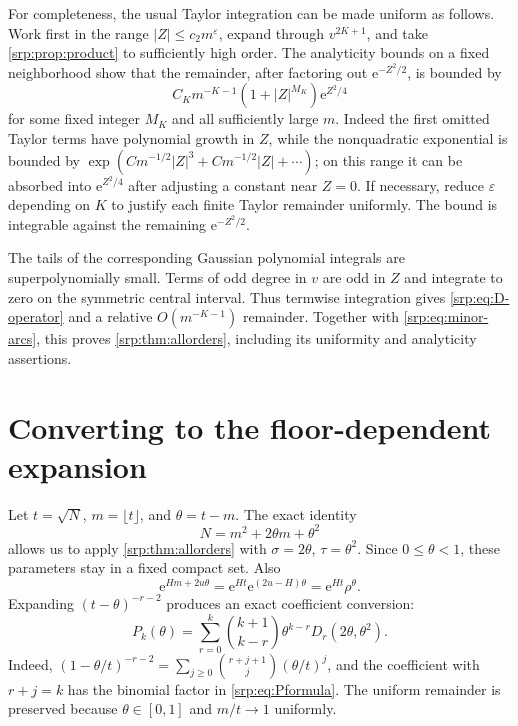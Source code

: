 \documentclass[11pt,a4paper]{article}
\numberwithin{equation}{section}
\theoremstyle{definition}
\theoremstyle{remark}
\newcommand{\e}{\mathrm e}
\begin{document}
For completeness, the usual Taylor integration can be made uniform as
follows. Work first in the range $|Z|\le c_2m^\varepsilon$, expand through
$v^{2K+1}$, and take \cref{srp:prop:product} to sufficiently high order.
The analyticity bounds on a fixed neighborhood show that the remainder,
after factoring out $\e^{-Z^2/2}$, is bounded by
\[
 C_K m^{-K-1}(1+|Z|^{M_K})\e^{Z^2/4}
\]
for some fixed integer $M_K$ and all sufficiently large $m$. Indeed the
first omitted Taylor terms have polynomial growth in $Z$, while the
nonquadratic exponential is bounded by
$\exp(Cm^{-1/2}|Z|^3+C m^{-1/2}|Z|+\cdots)$; on this range it can be
absorbed into $\e^{Z^2/4}$ after adjusting a constant near $Z=0$.
If necessary, reduce $\varepsilon$ depending on $K$ to justify each
finite Taylor remainder uniformly. The bound is integrable against the
remaining $\e^{-Z^2/2}$.

The tails of the corresponding Gaussian polynomial integrals are
superpolynomially small. Terms of odd degree in $v$ are odd in $Z$ and
integrate to zero on the symmetric central interval. Thus termwise
integration gives \eqref{srp:eq:D-operator} and a relative
$O(m^{-K-1})$ remainder. Together with \eqref{srp:eq:minor-arcs}, this proves
\cref{srp:thm:allorders}, including its uniformity and analyticity assertions.

\section{Converting to the floor-dependent expansion}
\label{srp:sec:floor}

Let $t=\sqrt N$, $m=\lfloor t\rfloor$, and $\theta=t-m$. The exact identity
\begin{equation}
 N=m^2+2\theta m+\theta^2
 \label{srp:eq:phase-substitution}
\end{equation}
allows us to apply \cref{srp:thm:allorders} with
$\sigma=2\theta$, $\tau=\theta^2$. Since $0\le\theta<1$, these parameters
stay in a fixed compact set. Also
\begin{equation}
 \e^{Hm+2u\theta}
 =\e^{Ht}\e^{(2u-H)\theta}
 =\e^{Ht}\rho^\theta.
 \label{srp:eq:phasefactor}
\end{equation}
Expanding $(t-\theta)^{-r-2}$ produces an exact coefficient conversion:
\begin{equation}
 \boxed{\quad
 P_k(\theta)=\sum_{r=0}^k
 \binom{k+1}{k-r}\theta^{k-r}D_r(2\theta,\theta^2).
 \quad}
 \label{srp:eq:Pformula}
\end{equation}
Indeed,
$(1-\theta/t)^{-r-2}=\sum_{j\ge0}\binom{r+j+1}{j}(\theta/t)^j$,
and the coefficient with $r+j=k$ has the binomial factor in
\eqref{srp:eq:Pformula}. The uniform remainder is preserved because
$\theta\in[0,1]$ and $m/t\to1$ uniformly.
\end{document}
